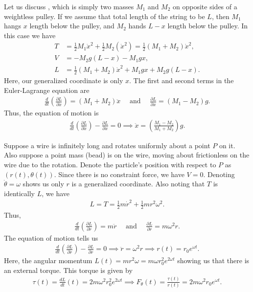 \begin{example}
    Let us discuss , which is simply two masses $M_{1}$ and $M_{2}$ on opposite sides of a weightless pulley. If we assume that total length of the string to be $L$, then $M_{1}$ hangs $x$ length below the pulley, and $M_{2}$ hands $L-x$ length below the pulley. In this case we have
    \begin{align}
        T &= \frac{1}{2} M_{1} \dot{x}^{2} + \frac{1}{2}M_{2}(\dot{x}^{2}) = \frac{1}{2}(M_{1} + M_{2}) \dot{x}^{2},\\
        V &= -M_{2}g(L-x) - M_{1}gx,\\
        L &= \frac{1}{2}(M_{1}+M_{2})\dot{x}^{2} + M_{1}gx + M_{2}g(L-x).
    \end{align}
    Here, our generalized coordinate is only $x$. The first and second terms in the Euler-Lagrange equation are
    \begin{align}
        \frac{d}{dt}\left( \frac{\partial L}{\partial \dot{x}} \right) = (M_{1}+M_{2})\ddot{x}\quad\text{ and }\quad\frac{\partial L}{\partial x} = (M_{1}-M_{2})g.
    \end{align}
    Thus, the equation of motion is
    \begin{align}
        \frac{d}{dt}\left( \frac{\partial L}{\partial \dot{x}} \right) - \frac{\partial L}{\partial x} = 0 \implies \ddot{x} = \left( \frac{M_{1}-M_{2}}{M_{1}+M_{2}} \right)g.
    \end{align}
\end{example}

\begin{example}
    Suppose a wire is infinitely long and rotates uniformly about a point $P$ on it. Also suppose a point mass (bead) is on the wire, moving about frictionless on the wire due to the rotation. Denote the particle's position with respect to $P$ as $(r(t),\theta(t))$. Since there is no constraint force, we have $V = 0$. Denoting $\dot{\theta} = \omega$ shows us only $r$ is a generalized coordinate. Also noting that $T$ is identically $L$, we have
    \begin{align}
        L = T = \frac{1}{2} m\dot{r}^{2} + \frac{1}{2}mr^{2}\omega^{2}.
    \end{align}
    Thus,
    \begin{align}
        \frac{d}{dt}\left( \frac{\partial L}{\partial \dot{r}} \right) = m\ddot{r}\quad\text{ and }\quad\frac{\partial L}{\partial r} = m \omega^{2} r.
    \end{align}
    The equation of motion tells us
    \begin{align}
        \frac{d}{dt}\left( \frac{\partial L}{\partial \dot{r}} \right) - \frac{\partial L}{\partial r} = 0 \implies \ddot{r} = \omega^{2} r \implies r(t) = r_{0}e^{\omega t}.
    \end{align}
    Here, the angular momentum $L(t) = mr^{2} \omega = m\omega r_{0}^{2} e^{2\omega t}$ showing us that there is an external torque. This torque is given by
    \begin{align}
        \tau(t) = \frac{dL}{dt}(t) = 2m\omega^{2} r_{0}^{2} e^{2\omega t} \implies F_{\theta}(t) = \frac{\tau(t)}{r(t)} = 2 m \omega^{2} r_{0} e^{\omega t}.
    \end{align}
\end{example}
